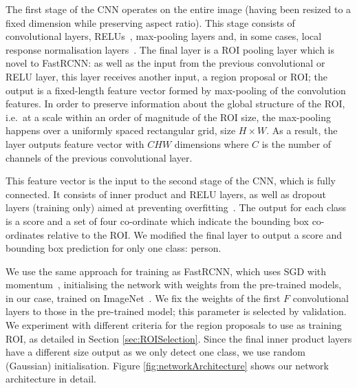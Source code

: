 \documentclass[runningheads]{llncs}
\begin{document}
The first stage of the \ac{CNN} operates on the entire image (having been resized to a fixed dimension while preserving aspect ratio).
This stage consists of convolutional layers, \acp{RELU}~\cite{krizhevsky2012imagenet,nair2010rectified}, max-pooling layers and, in some cases, local response normalisation layers~\cite{krizhevsky2012imagenet}.
The final layer is a \ac{ROI} pooling layer which is novel to \ac{FastRCNN}: as well as the input from the previous convolutional or \ac{RELU} layer, this layer receives another input, a region proposal or \ac{ROI}; the  output is a fixed-length feature vector formed by max-pooling of the convolution features.
In order to preserve information about the global structure of the \ac{ROI}, i.e.\ at a scale within an order of magnitude of the \ac{ROI} size, the max-pooling happens over a uniformly spaced rectangular grid, size
\begin{math}
H \times W
\end{math}.
As a result, the layer outputs feature vector with
\begin{math}
CHW 
\end{math}
dimensions where
\begin{math}
C    
\end{math}
is the number of channels of the previous convolutional layer.

This feature vector is the input to the second stage of the \ac{CNN}, which is fully connected.
It consists of inner product and \ac{RELU} layers, as well as dropout layers (training only) aimed at preventing overfitting~\cite{srivastava2014dropout}.
The output for each class is a score and a set of four co-ordinate which indicate the bounding box co-ordinates relative to the \ac{ROI}.
We modified the final layer to output a score and bounding box prediction for only one class: person.

We use the same approach for training as \ac{FastRCNN}, which uses \ac{SGD} with momentum~\cite{krizhevsky2012imagenet}, initialising the network with weights from the pre-trained models, in our case, trained on ImageNet~\cite{deng2009imagenet,krizhevsky2012imagenet}. 
We fix the weights of the first 
\begin{math}
  F
\end{math}
convolutional layers to those in the pre-trained model; this parameter is selected by validation.
We experiment with different criteria for the region proposals to use as training \ac{ROI}, as detailed in Section \ref{sec:ROISelection}.
Since the final inner product layers have a different size output as we only detect one class, we use random (Gaussian) initialisation.
Figure \ref{fig:networkArchitecture} shows our network architecture in detail.
\end{document}
